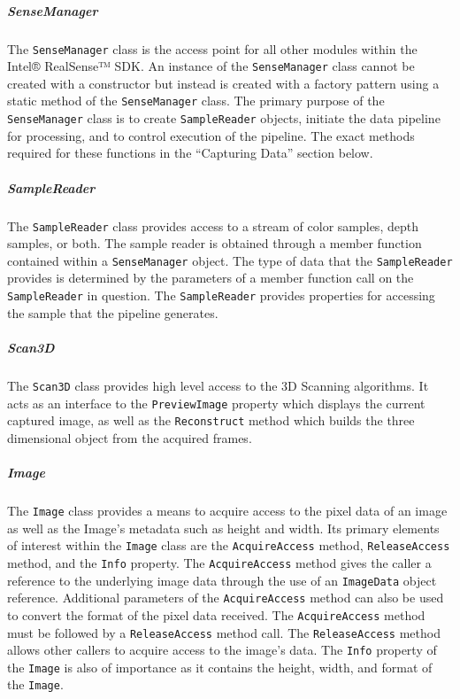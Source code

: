 \documentclass[12pt]{article}
\begin{document}
\subparagraph{SenseManager}\label{sensemanager}

The \texttt{SenseManager} class is the access point for all other
modules within the Intel® RealSense™ SDK. An instance of the
\texttt{SenseManager} class cannot be created with a constructor but
instead is created with a factory pattern using a static method of the
\texttt{SenseManager} class. The primary purpose of the
\texttt{SenseManager} class is to create \texttt{SampleReader} objects,
initiate the data pipeline for processing, and to control execution of
the pipeline. The exact methods required for these functions in the
``Capturing Data'' section below.

\subparagraph{SampleReader}\label{samplereader}

The \texttt{SampleReader} class provides access to a stream of color
samples, depth samples, or both. The sample reader is obtained through a
member function contained within a \texttt{SenseManager} object. The
type of data that the \texttt{SampleReader} provides is determined by
the parameters of a member function call on the \texttt{SampleReader} in
question. The \texttt{SampleReader} provides properties for accessing
the sample that the pipeline generates.

\subparagraph{Scan3D}\label{scan3d}

The \texttt{Scan3D} class provides high level access to the 3D Scanning
algorithms. It acts as an interface to the \texttt{PreviewImage}
property which displays the current captured image, as well as the
\texttt{Reconstruct} method which builds the three dimensional object
from the acquired frames.

\subparagraph{Image}\label{image}

The \texttt{Image} class provides a means to acquire access to the pixel
data of an image as well as the Image's metadata such as height and
width. Its primary elements of interest within the \texttt{Image} class
are the \texttt{AcquireAccess} method, \texttt{ReleaseAccess} method,
and the \texttt{Info} property. The \texttt{AcquireAccess} method gives
the caller a reference to the underlying image data through the use of
an \texttt{ImageData} object reference. Additional parameters of the
\texttt{AcquireAccess} method can also be used to convert the format of
the pixel data received. The \texttt{AcquireAccess} method must be
followed by a \texttt{ReleaseAccess} method call. The
\texttt{ReleaseAccess} method allows other callers to acquire access to
the image's data. The \texttt{Info} property of the \texttt{Image} is
also of importance as it contains the height, width, and format of the
\texttt{Image}.
\end{document}
